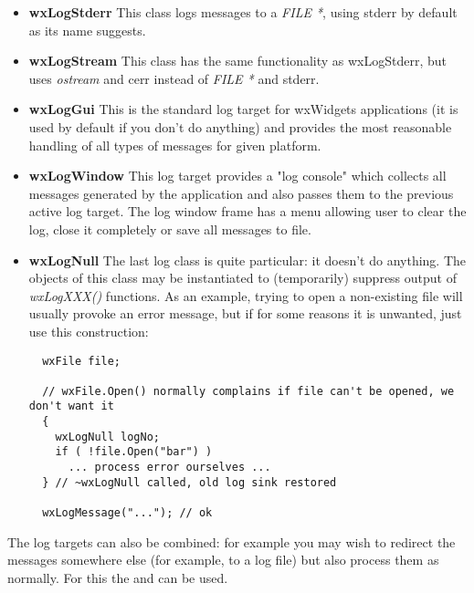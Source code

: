\begin{itemize}\itemsep=0pt
\item{\bf wxLogStderr} This class logs messages to a {\it FILE *}, using
stderr by default as its name suggests.
\item{\bf wxLogStream} This class has the same functionality as wxLogStderr,
but uses {\it ostream} and cerr instead of {\it FILE *} and stderr.
\item{\bf wxLogGui} This is the standard log target for wxWidgets
applications (it is used by default if you don't do anything) and provides the
most reasonable handling of all types of messages for given platform.
\item{\bf wxLogWindow} This log target provides a "log console" which
collects all messages generated by the application and also passes them to the
previous active log target. The log window frame has a menu allowing user to
clear the log, close it completely or save all messages to file.
\item{\bf wxLogNull} The last log class is quite particular: it doesn't do
anything. The objects of this class may be instantiated to (temporarily)
suppress output of {\it wxLogXXX()} functions. As an example, trying to open a
non-existing file will usually provoke an error message, but if for some
reasons it is unwanted, just use this construction:

{\small%
\begin{verbatim}
  wxFile file;

  // wxFile.Open() normally complains if file can't be opened, we don't want it
  {
    wxLogNull logNo;
    if ( !file.Open("bar") )
      ... process error ourselves ...
  } // ~wxLogNull called, old log sink restored
  
  wxLogMessage("..."); // ok
\end{verbatim}
}%
\end{itemize}

The log targets can also be combined: for example you may wish to redirect the
messages somewhere else (for example, to a log file) but also process them as
normally. For this the  and 
 can be used.

